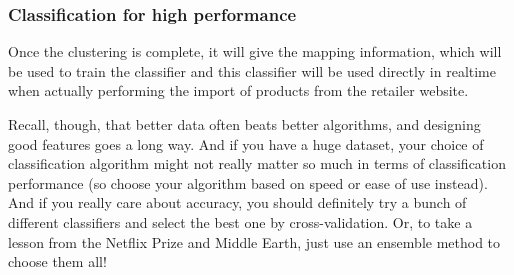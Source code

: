 \documentclass[12pt]{book}
\begin{document}
\subsubsection{Classification for high performance}
Once the clustering is complete, it will give the mapping information, which will be used to train the classifier and this classifier will be used directly in realtime when actually performing the import of products from the retailer website.

Recall, though, that better data often beats better algorithms, and designing good features goes a long way. And if you have a huge dataset, your choice of classification algorithm might not really matter so much in terms of classification performance (so choose your algorithm based on speed or ease of use instead).
And if you really care about accuracy, you should definitely try a bunch of different classifiers and select the best one by cross-validation. Or, to take a lesson from the Netflix Prize and Middle Earth, just use an ensemble method to choose them all!
\end{document}
